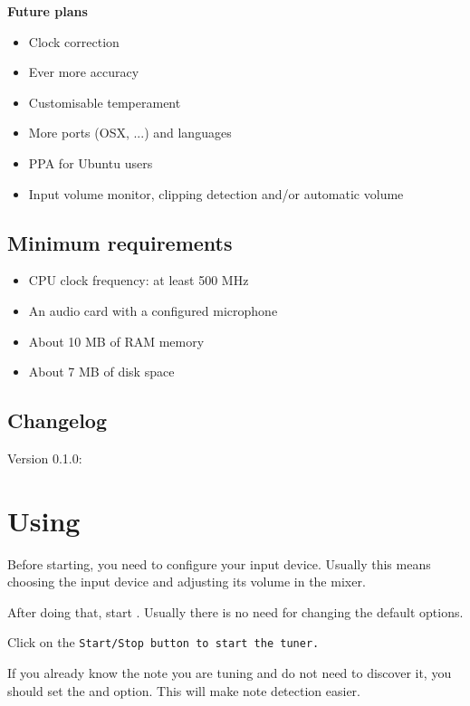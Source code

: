 \textbf{Future plans}
\begin{itemize}
	\item Clock correction
	\item Ever more accuracy
	\item Customisable temperament
	\item More ports (OSX, ...) and languages
	\item PPA for Ubuntu users
	\item Input volume monitor, clipping detection and/or automatic volume
\end{itemize}

\section{Minimum requirements}\label{requirements}

\begin{itemize}
\item CPU clock frequency: at least 500 MHz
\item An audio card with a configured microphone
\item About 10 MB of RAM memory
\item About 7 MB of disk space
\end{itemize}

\section{Changelog}\label{changelog}

Version 0.1.0:


\chapter{Using }\label{using}

Before starting, you need to configure your input device.
Usually this means choosing the input device and adjusting
its volume in the mixer.

After doing that, start . Usually there is
no need for changing the default options.

Click on the \tt{Start/Stop} button to start the tuner.

If you already know the note you are tuning and do not need to
discover it, you should set the  and
 option.
This will make note detection easier.

